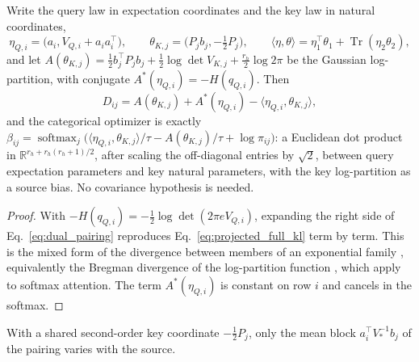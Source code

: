 \documentclass[twoside,11pt]{article}
\newcommand{\softmax}{\operatorname{softmax}}
\begin{document}
\begin{theorem}
\label{thm:dual_coordinates}
Write the query law in expectation coordinates and the key law in natural coordinates,
\begin{equation}
\eta_{Q,i}=\bigl(a_i,V_{Q,i}+a_ia_i^\top\bigr),\qquad
\theta_{K,j}=\bigl(P_jb_j,-\tfrac12P_j\bigr),\qquad
\langle\eta,\theta\rangle=\eta_1^\top\theta_1+\operatorname{Tr}(\eta_2\theta_2),
\end{equation}
and let $A(\theta_{K,j})=\tfrac12b_j^\top P_jb_j+\tfrac12\log\det V_{K,j}+\tfrac{r_h}2\log2\pi$ be the Gaussian log-partition, with conjugate $A^*(\eta_{Q,i})=-H(q_{Q,i})$. Then
\begin{equation}
D_{ij}=A(\theta_{K,j})+A^*(\eta_{Q,i})-\langle\eta_{Q,i},\theta_{K,j}\rangle,
\label{eq:dual_pairing}
\end{equation}
and the categorical optimizer is exactly $\beta_{ij}=\softmax_j\bigl(\langle\eta_{Q,i},\theta_{K,j}\rangle/\tau-A(\theta_{K,j})/\tau+\log\pi_{ij}\bigr)$: a Euclidean dot product in $\mathbb R^{r_h+r_h(r_h+1)/2}$, after scaling the off-diagonal entries by $\sqrt2$, between query expectation parameters and key natural parameters, with the key log-partition as a source bias. No covariance hypothesis is needed.
\end{theorem}
\begin{proof}
With $-H(q_{Q,i})=-\tfrac12\log\det(2\pi eV_{Q,i})$, expanding the right side of Eq.~\eqref{eq:dual_pairing} reproduces Eq.~\eqref{eq:projected_full_kl} term by term. This is the mixed form of the divergence between members of an exponential family \citep[Sec.~5.2, Eq.~(5.11)]{Wainwright2008}, equivalently the Bregman divergence of the log-partition function \citep{Banerjee2005Bregman}, which \citet{Rubacher2026Fisher} apply to softmax attention. The term $A^*(\eta_{Q,i})$ is constant on row $i$ and cancels in the softmax.
\end{proof}
With a shared second-order key coordinate $-\tfrac12P_j$, only the mean block $a_i^\top V_*^{-1}b_j$ of the pairing varies with the source.
\end{document}
